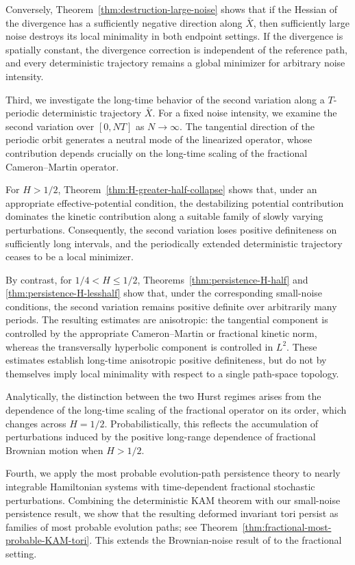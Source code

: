 \documentclass[preprint,12pt]{elsarticle}
\theoremstyle{definition}
\theoremstyle{plain}
\begin{document}
Conversely, Theorem~\ref{thm:destruction-large-noise} shows that if the
Hessian of the divergence has a sufficiently negative direction along
$\bar X$, then sufficiently large noise destroys its local minimality in both
endpoint settings. If the divergence is spatially constant, the divergence
correction is independent of the reference path, and every deterministic
trajectory remains a global minimizer for arbitrary noise intensity.



Third, we investigate the long-time behavior of the second variation along a
$T$-periodic deterministic trajectory $\bar X$. For a fixed noise intensity,
we examine the second variation over $[0,NT]$ as $N\to\infty$. The tangential
direction of the periodic orbit generates a neutral mode of the linearized
operator, whose contribution depends crucially on the long-time scaling of
the fractional Cameron--Martin operator.

For $H>1/2$, Theorem~\ref{thm:H-greater-half-collapse} shows that, under an
appropriate effective-potential condition, the destabilizing potential
contribution dominates the kinetic contribution along a suitable family of
slowly varying perturbations. Consequently, the second variation loses
positive definiteness on sufficiently long intervals, and the periodically
extended deterministic trajectory ceases to be a local minimizer.

By contrast, for $1/4<H\leq1/2$,
Theorems~\ref{thm:persistence-H-half} and
\ref{thm:persistence-H-lesshalf} show that, under the corresponding
small-noise conditions, the second variation remains positive definite over
arbitrarily many periods. The resulting estimates are anisotropic: the
tangential component is controlled by the appropriate Cameron--Martin or
fractional kinetic norm, whereas the transversally hyperbolic component is
controlled in $L^2$. These estimates establish long-time anisotropic positive
definiteness, but do not by themselves imply local minimality with respect to
a single path-space topology.

Analytically, the distinction between the two Hurst regimes arises from the
dependence of the long-time scaling of the fractional operator on its order,
which changes across $H=1/2$. Probabilistically, this reflects the
accumulation of perturbations induced by the positive long-range dependence
of fractional Brownian motion when $H>1/2$.


    Fourth, we apply the most probable evolution-path persistence theory to
nearly integrable Hamiltonian systems with time-dependent fractional
stochastic perturbations. Combining the deterministic KAM theorem with our
small-noise persistence result, we show that the resulting deformed invariant
tori persist as families of most probable evolution paths; see
Theorem~\ref{thm:fractional-most-probable-KAM-tori}. This extends the
Brownian-noise result of \cite{xinze2026most} to the fractional setting.
\end{document}
